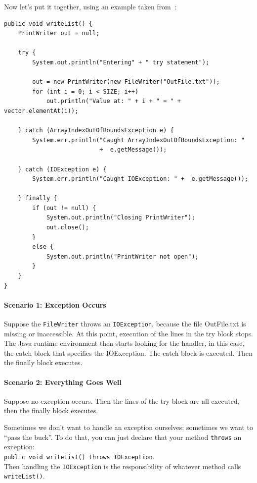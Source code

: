 Now let's put it together, using an example taken from~\cite{oracle:exceptions}:
\begin{verbatim}
public void writeList() {
    PrintWriter out = null;

    try {
        System.out.println("Entering" + " try statement");

        out = new PrintWriter(new FileWriter("OutFile.txt"));
        for (int i = 0; i < SIZE; i++)
            out.println("Value at: " + i + " = " + vector.elementAt(i));
                  
    } catch (ArrayIndexOutOfBoundsException e) {
        System.err.println("Caught ArrayIndexOutOfBoundsException: "
                           +  e.getMessage());
                                 
    } catch (IOException e) {
        System.err.println("Caught IOException: " +  e.getMessage());
                                 
    } finally {
        if (out != null) {
            System.out.println("Closing PrintWriter");
            out.close();
        } 
        else {
            System.out.println("PrintWriter not open");
        }
    }
}
\end{verbatim}

\paragraph{Scenario 1: Exception Occurs}
Suppose the \texttt{FileWriter} throws an \texttt{IOException}, because the file OutFile.txt is missing or inaccessible. At this point, execution of the lines in the try block stops. The Java runtime environment then starts looking for the handler, in this case, the catch block that specifies the IOException. The catch block is executed. Then the finally block executes.

\paragraph{Scenario 2: Everything Goes Well} Suppose no exception occurs. Then the lines of the try block are all executed, then the finally block executes.

Sometimes we don't want to handle an exception ourselves; sometimes we want to ``pass the buck''. To do that, you can just declare that your method \texttt{throws} an exception:\\\texttt{public void writeList() throws IOException}.\\
Then handling the \texttt{IOException} is the responsibility of whatever method calls \texttt{writeList()}.

